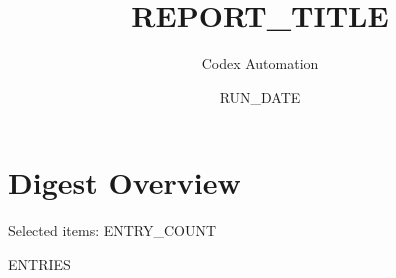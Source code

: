 \documentclass[12pt]{article}
\title{{{REPORT_TITLE}}}
\author{Codex Automation}
\date{{{RUN_DATE}}}
\begin{document}
\maketitle

\section*{Digest Overview}
Selected items: {{ENTRY_COUNT}}

{{ENTRIES}}
\end{document}
